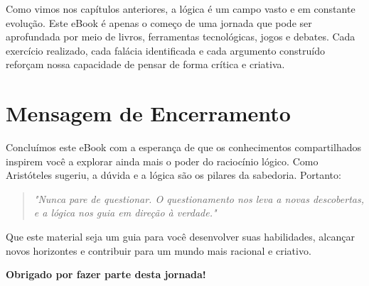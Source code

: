 \documentclass[a4paper,12pt]{book}
\begin{document}
Como vimos nos capítulos anteriores, a lógica é um campo vasto e em constante evolução. Este eBook é apenas o começo de uma jornada que pode ser aprofundada por meio de livros, ferramentas tecnológicas, jogos e debates. Cada exercício realizado, cada falácia identificada e cada argumento construído reforçam nossa capacidade de pensar de forma crítica e criativa.

\section*{Mensagem de Encerramento}

Concluímos este eBook com a esperança de que os conhecimentos compartilhados inspirem você a explorar ainda mais o poder do raciocínio lógico. Como Aristóteles sugeriu, a dúvida e a lógica são os pilares da sabedoria. Portanto:

\begin{quote}
    \textit{"Nunca pare de questionar. O questionamento nos leva a novas descobertas, e a lógica nos guia em direção à verdade."}
\end{quote}

Que este material seja um guia para você desenvolver suas habilidades, alcançar novos horizontes e contribuir para um mundo mais racional e criativo.

\vspace{1cm}
\begin{center}
    \textbf{Obrigado por fazer parte desta jornada!}
\end{center}
\end{document}
